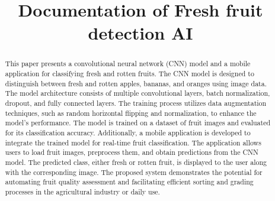 \documentclass[conference]{IEEEtran}
\begin{document}
\title{Documentation of Fresh fruit detection AI}

\author{
\and
{}
\and
{}
}
\maketitle

\begin{abstract}
This paper presents a convolutional neural network (CNN) model and a mobile application for classifying fresh and rotten fruits. The CNN model is designed to distinguish between fresh and rotten apples, bananas, and oranges using image data. The model architecture consists of multiple convolutional layers, batch normalization, dropout, and fully connected layers. The training process utilizes data augmentation techniques, such as random horizontal flipping and normalization, to enhance the model's performance. The model is trained on a dataset of fruit images and evaluated for its classification accuracy. Additionally, a mobile application is developed to integrate the trained model for real-time fruit classification. The application allows users to load fruit images, preprocess them, and obtain predictions from the CNN model. The predicted class, either fresh or rotten fruit, is displayed to the user along with the corresponding image. The proposed system demonstrates the potential for automating fruit quality assessment and facilitating efficient sorting and grading processes in the agricultural industry or daily use.
\\
\end{abstract}
\end{document}
